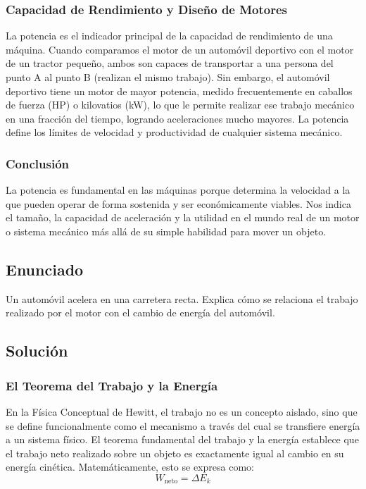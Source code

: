 \documentclass[a4paper,12pt]{article}
\begin{document}
\subsubsection*{Capacidad de Rendimiento y Diseño de Motores}
La potencia es el indicador principal de la capacidad de rendimiento de una máquina. Cuando comparamos el motor de un automóvil deportivo con el motor de un tractor pequeño, ambos son capaces de transportar a una persona del punto A al punto B (realizan el mismo trabajo). Sin embargo, el automóvil deportivo tiene un motor de mayor potencia, medido frecuentemente en caballos de fuerza (HP) o kilovatios (kW), lo que le permite realizar ese trabajo mecánico en una fracción del tiempo, logrando aceleraciones mucho mayores. La potencia define los límites de velocidad y productividad de cualquier sistema mecánico.

\subsubsection*{Conclusión}
La potencia es fundamental en las máquinas porque determina la velocidad a la que pueden operar de forma sostenida y ser económicamente viables. Nos indica el tamaño, la capacidad de aceleración y la utilidad en el mundo real de un motor o sistema mecánico más allá de su simple habilidad para mover un objeto.

\newpage

\subsection*{Enunciado}
Un automóvil acelera en una carretera recta. 
Explica cómo se relaciona el trabajo realizado por el motor con el cambio de energía del automóvil.

\subsection*{Solución}

\subsubsection*{El Teorema del Trabajo y la Energía}
En la Física Conceptual de Hewitt, el trabajo no es un concepto aislado, sino que se define funcionalmente como el mecanismo a través del cual se transfiere energía a un sistema físico. El teorema fundamental del trabajo y la energía establece que el trabajo neto realizado sobre un objeto es exactamente igual al cambio en su energía cinética. Matemáticamente, esto se expresa como:
$$W_{\text{neto}} = \Delta E_k$$
\end{document}
